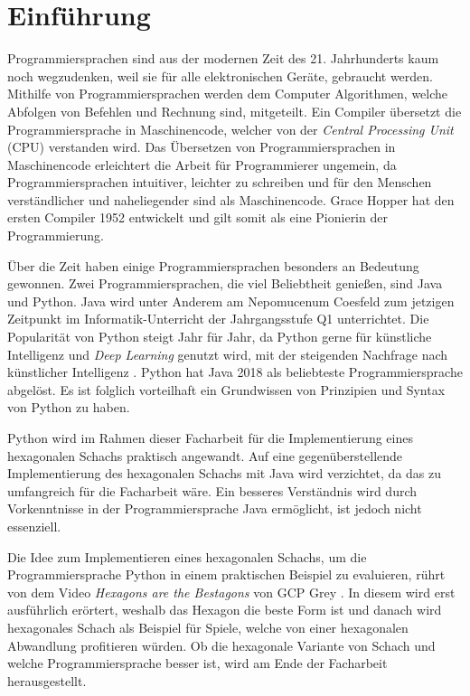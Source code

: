 \chapter{Einführung} %
Programmiersprachen sind aus der modernen Zeit des 21. Jahrhunderts kaum noch wegzudenken, weil sie für alle elektronischen Geräte, gebraucht werden. 
Mithilfe von Programmiersprachen werden dem Computer Algorithmen, welche Abfolgen von Befehlen und Rechnung sind, mitgeteilt. 
Ein Compiler übersetzt die Programmiersprache in Maschinencode, welcher von der \textit{Central Processing Unit} (CPU) verstanden wird. 
Das Übersetzen von Programmiersprachen in Maschinencode erleichtert die Arbeit für Programmierer ungemein, da Programmiersprachen intuitiver, leichter zu schreiben und für den Menschen verständlicher und naheliegender sind als Maschinencode. 
Grace Hopper hat den ersten Compiler 1952 entwickelt und gilt somit als eine Pionierin der Programmierung.
\cite{Louis:2010}

\par %
Über die Zeit haben einige Programmiersprachen besonders an Bedeutung gewonnen. 
Zwei Programmiersprachen, die viel Beliebtheit genießen, sind Java und Python. 
Java wird unter Anderem am Nepomucenum Coesfeld zum jetzigen Zeitpunkt im Informatik-Unterricht der Jahrgangsstufe Q1 unterrichtet. 
Die Popularität von Python steigt Jahr für Jahr, da Python gerne für künstliche Intelligenz und \textit{Deep Learning} genutzt wird, mit der steigenden Nachfrage nach künstlicher Intelligenz \cite{Github:PYPL}\cite{Gray:2017}. 
Python hat Java 2018 als beliebteste Programmiersprache abgelöst. 
Es ist folglich vorteilhaft ein Grundwissen von Prinzipien und Syntax von Python zu haben. 

\par %
Python wird im Rahmen dieser Facharbeit für die Implementierung eines hexagonalen Schachs praktisch angewandt. 
Auf eine gegenüberstellende Implementierung des hexagonalen Schachs mit Java wird verzichtet, da das zu umfangreich für die Facharbeit wäre. 
Ein besseres Verständnis wird durch Vorkenntnisse in der Programmiersprache Java ermöglicht, ist jedoch nicht essenziell. 

\par %
Die Idee zum Implementieren eines hexagonalen Schachs, um die Programmiersprache Python in einem praktischen Beispiel zu evaluieren, rührt von dem Video \textit{Hexagons are the Bestagons} von GCP Grey \cite{Grey:Bestagons}. 
In diesem wird erst ausführlich erörtert, weshalb das Hexagon die beste Form ist und danach wird hexagonales Schach als Beispiel für Spiele, welche von einer hexagonalen Abwandlung profitieren würden. 
Ob die hexagonale Variante von Schach und welche Programmiersprache besser ist, wird am Ende der Facharbeit herausgestellt.
